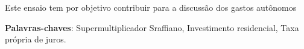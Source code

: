 \documentclass[
article,			%
12pt,				%
a4paper,			%
hidelinks,
english,			%
brazil,				%
sumario=tradicional,
twoside
]{abntex2}
\begin{document}
\maketitle



\begin{resumo}
Este ensaio tem por objetivo contribuir para a discussão dos gastos autônomos

\vspace{\onelineskip}
\noindent\textbf{Palavras-chaves}: Supermultiplicador Sraffiano, Investimento residencial, Taxa própria de juros.
\end{resumo}

\OnehalfSpacing








\SingleSpacing

{\let\clearpage\relax\printbibliography}

%
\end{document}
